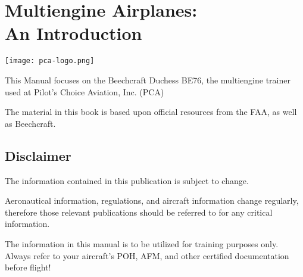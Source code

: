 
\chapter*{Multiengine Airplanes:\\An Introduction}

\begin{center}
\texttt{[image: pca-logo.png]}
\end{center}

%
This Manual focuses on the Beechcraft Duchess BE76, the multiengine trainer used at Pilot's
Choice Aviation, Inc. (PCA)

The material in this book is based upon official resources from the FAA, as well as Beechcraft.

%
%

\section*{Disclaimer}

The information contained in this publication is subject to change.

Aeronautical information, regulations, and aircraft information change regularly, therefore those relevant
publications should be referred to for any critical information.

The information in this manual is to be utilized for training purposes only. Always
refer to your aircraft's POH, AFM, and other certified documentation before flight!
